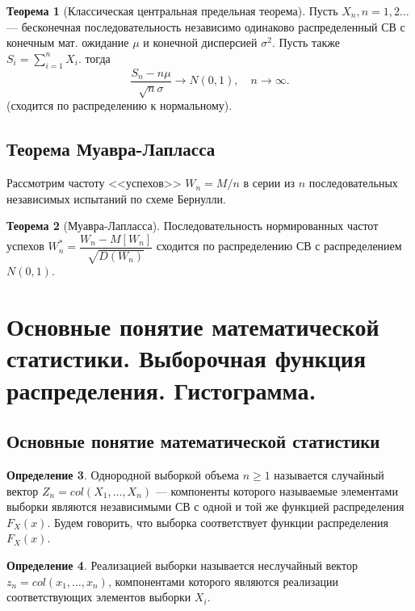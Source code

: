 \documentclass[12pt]{report}
\theoremstyle{definition}
\newtheorem{theorem}{Теорема}[chapter]
\newtheorem{definition}[theorem]{Определение}
\begin{document}
\begin{theorem}[Классическая центральная предельная теорема]
Пусть $X_n, n = 1, 2 \dots$ --- бесконечная последовательность независимо одинаково
распределенный СВ с конечным мат. ожидание $\mu$ и конечной дисперсией $\sigma^2$.
Пусть также $S_i = \sum\limits_{i = 1}^n X_i$. тогда
$$
\dfrac{S_n - n \mu}{\sqrt{n} \sigma} \rightarrow N(0, 1),\quad n\rightarrow \infty.
$$ (сходится по распределению к нормальному).
\end{theorem}

\subsection{Теорема Муавра-Лапласса}
Рассмотрим частоту <<успехов>> $W_n = M / n$ в серии из $n$
последовательных независимых испытаний по схеме Бернулли.

\begin{theorem}[Муавра-Лапласса]
Последовательность нормированных частот успехов $W^*_n = \dfrac{W_n - M[W_n]}{\sqrt{D(W_n)}}$
сходится по распределению СВ с распределением $N(0,1)$.
\end{theorem}
 

\section
{
  Основные понятие математической статистики.
  Выборочная функция распределения. Гистограмма.
}

\subsection{Основные понятие математической статистики}

\begin{definition}
Однородной выборкой объема $n \ge 1$ называется случайный вектор
$Z_n = col(X_1, \dots, X_n)$ --- компоненты которого называемые
элементами выборки являются независимыми СВ с одной и той же функцией
распределения $F_X(x)$. Будем говорить, что выборка соответствует
функции распределения $F_X(x)$.
\end{definition}

\begin{definition}
Реализацией выборки называется неслучайный вектор $z_n = col(x_1, \dots, x_n)$,
компонентами которого являются реализации соответствующих элементов выборки $X_i$.
\end{definition}
\end{document}

